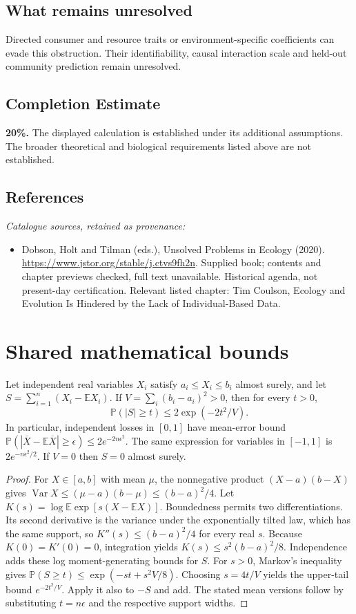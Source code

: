 \documentclass[11pt]{article}
\begin{document}
\subsection{What remains unresolved}
Directed consumer and resource traits or environment-specific coefficients can evade this obstruction. Their identifiability, causal interaction scale and held-out community prediction remain unresolved.
\subsection{Completion Estimate}
\textbf{20\%.} The displayed calculation is established under its additional assumptions. The broader theoretical and biological requirements listed above are not established.
\subsection{References}
\noindent\emph{Catalogue sources, retained as provenance:}
\begin{itemize}
\item Dobson, Holt and Tilman (eds.), Unsolved Problems in Ecology (2020). \url{https://www.jstor.org/stable/j.ctvs9fh2n}. Supplied book; contents and chapter previews checked, full text unavailable. Historical agenda, not present-day certification. Relevant listed chapter: Tim Coulson, Ecology and Evolution Is Hindered by the Lack of Individual-Based Data.
\end{itemize}




\section{Shared mathematical bounds}\label{app:bounds}
\begin{lemma}\label{lem:bounded}
Let independent real variables $X_i$ satisfy $a_i\leq X_i\leq b_i$ almost surely,
and let $S=\sum_{i=1}^n(X_i-\mathbb{E} X_i)$. If
$V=\sum_i(b_i-a_i)^2>0$, then for every $t>0$,
\[
 \mathbb{P}(|S|\geq t)\leq 2\exp(-2t^2/V).
\]
In particular, independent losses in $[0,1]$ have mean-error bound
$\mathbb{P}(|\overline X-\mathbb{E}\overline X|\geq\epsilon)
\leq2e^{-2n\epsilon^2}$. The same expression for variables in $[-1,1]$
is $2e^{-n\epsilon^2/2}$. If $V=0$ then $S=0$ almost surely.
\end{lemma}
\begin{proof}
For $X\in[a,b]$ with mean $\mu$, the nonnegative product
$(X-a)(b-X)$ gives
$\operatorname{Var} X\leq(\mu-a)(b-\mu)\leq(b-a)^2/4$.
Let $K(s)=\log\mathbb{E}\exp[s(X-\mathbb{E} X)]$.
Boundedness permits two differentiations. Its second derivative is the variance
under the exponentially tilted law, which has the same support, so
$K''(s)\leq(b-a)^2/4$ for every real $s$.
Because $K(0)=K'(0)=0$, integration yields
$K(s)\leq s^2(b-a)^2/8$.
Independence adds these log moment-generating bounds for $S$.
For $s>0$, Markov's inequality gives
$\mathbb{P}(S\geq t)\leq\exp(-st+s^2V/8)$.
Choosing $s=4t/V$ yields the upper-tail bound $e^{-2t^2/V}$.
Apply it also to $-S$ and add. The stated mean versions follow by substituting
$t=n\epsilon$ and the respective support widths.
\end{proof}
\end{document}
